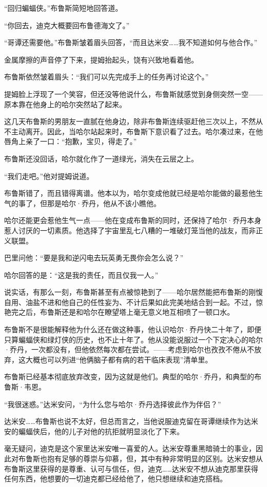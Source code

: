 \documentclass[../main]{subfiles}
\begin{document}
“回归蝙蝠侠。”布鲁斯简短地回答道。

“你回去，迪克大概要回布鲁德海文了。”

“哥谭还需要他。”布鲁斯皱着眉头回答，“而且达米安……我不知道如何与他合作。”

金属摩擦的声音停了下来，提姆抬起头，饶有兴致地看着他。

布鲁斯依然皱着眉头：“我们可以先完成手上的任务再讨论这个。”

提姆脸上浮现了一个笑容，但还没等他说什么，布鲁斯就感觉到身侧突然一空——原本靠在他身上的哈尔突然站了起来。

这几天布鲁斯的男朋友一直腻在他身边，除非布鲁斯连续驱赶他三次以上，不然从不主动离开。因此，当哈尔站起来时，布鲁斯下意识看了过去。哈尔凑过来，在他唇角上亲了一口：“抱歉，宝贝，得走了。”

布鲁斯还没回话，哈尔就化作了一道绿光，消失在云层之上。

“我们走吧。”他对提姆说道。

布鲁斯错了，而且错得离谱。他本以为，哈尔变成他就已经是哈尔能做的最惹他生气的事了，但那是哈尔·乔丹，他从不该小瞧他。

哈尔还能更会惹他生气一点——他在变成布鲁斯的同时，还保持了哈尔·乔丹本身惹人讨厌的一切素质。他选择了宇宙里乱七八糟的一堆破灯笼当他的战友，而非正义联盟。

巴里问他：“要是我和逆闪电去玩英勇无畏你会怎么说？”

哈尔回答的是：“这是我的责任，而且仅我一人。”

说实话，有那么一刻，布鲁斯甚至有点被惊艳到了——哈尔居然能把布鲁斯的刚愎自用、油盐不进和他自己的任性妄为、不计后果如此完美地结合到一起。不过，惊艳完之后，布鲁斯还是和哈尔在瞭望塔上毫无意义地互相喷了一顿口水。

布鲁斯不是很能解释他为什么还在做这种事，他认识哈尔·乔丹快二十年了，即便只算蝙蝠侠和绿灯侠的历史，也不止十年了。他从没能说服过一个下定决心的哈尔·乔丹，一次都没有，但他依然每次都在尝试。——考虑到哈尔也孜孜不倦从不放弃，这大概也可以列进“他俩脑子都有病的若干临床表现”清单里。

布鲁斯已经基本彻底放弃改变，因为这就是他们。典型的哈尔·乔丹，和典型的布鲁斯·韦恩。

“我很迷惑。”达米安问，“为什么您与哈尔·乔丹选择彼此作为伴侣？”

达米安……布鲁斯也说不太好，但总而言之，当他说服迪克留在哥谭继续作为达米安的蝙蝠侠后，他的儿子对他的抗拒就明显淡化了下来。

毫无疑问，迪克是这个家里达米安唯一喜爱的人。达米安尊重黑暗骑士的事业，因此对布鲁斯也抱有足够的尊崇与仰慕，但，其中有种非常明显的区别。达米安想从布鲁斯这里获得的是尊重、认可与信任，但，迪克……达米安不想从迪克那里获得任何东西，他想要的一切迪克都已经给他了，他只想继续和迪克搭档。
\end{document}
